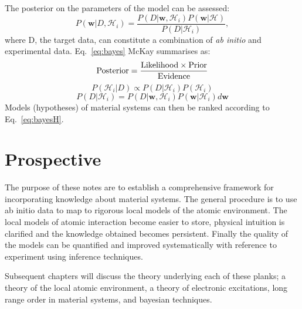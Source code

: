 The posterior on the parameters of the model can be assessed:
%
\begin{equation}
\label{eq:bayes}
P(\mathbf{w}|D, \mathcal{H}_{i}) = \frac{P(D|\mathbf{w}, \mathcal{H}_{i})P(\mathbf{w}|\mathcal{H})}{P(D|\mathcal{H}_{i})},
\end{equation}
%
where D, the target data, can constitute a combination of {\it ab initio} and experimental data. 
Eq.~\ref{eq:bayes} McKay summarises as:
\begin{equation}
{\rm Posterior} = \frac{{\rm Likelihood} \times {\rm Prior}}{{\rm Evidence}}
\end{equation}
%
\begin{equation}
\label{eq:bayesH}
P(\mathcal{H}_{i}|D) \propto P(D|\mathcal{H}_{i})P(\mathcal{H}_{i})
\end{equation}
%
\begin{equation}
\label{eq:bayesH}
P(D|\mathcal{H}_{i}) = P(D|\mathbf{w}, \mathcal{H}_{i})P(\mathbf{w}|\mathcal{H}_{i})d\mathbf{w}
\end{equation}
%
Models (hypotheses) of material systems can then be ranked according to Eq.~\ref{eq:bayesH}.

\section{Prospective}
The purpose of these notes are to establish a comprehensive framework 
for incorporating knowledge about material systems.
The general procedure is to use ab initio data to map 
to rigorous local models of the atomic environment. The local models
of atomic interaction become easier to store, physical intuition is clarified
and the knowledge obtained becomes persistent. Finally the quality of the models
can be quantified and improved systematically with reference to experiment using
inference techniques.

Subsequent chapters will discuss the theory underlying each of these planks; a
theory of the local atomic environment, a theory of electronic excitations, long
range order in material systems, and bayesian techniques.

